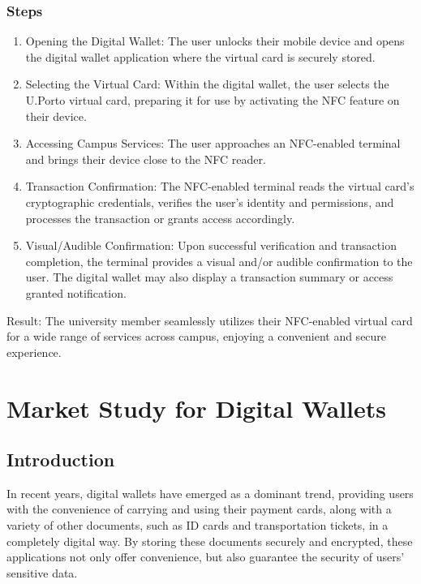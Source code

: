 \documentclass[10pt]{article}
\begin{document}
\subsubsection{Steps}
\begin{enumerate}
  \item Opening the Digital Wallet: The user unlocks their mobile device and opens the digital wallet application where the virtual card is securely stored.
  
  \item Selecting the Virtual Card: Within the digital wallet, the user selects the U.Porto virtual card, preparing it for use by activating the NFC feature on their device.
  
  \item Accessing Campus Services: The user approaches an NFC-enabled terminal and brings their device close to the NFC reader.
  
  \item Transaction Confirmation: The NFC-enabled terminal reads the virtual card's cryptographic credentials, verifies the user's identity and permissions, and processes the transaction or grants access accordingly.
  
  \item Visual/Audible Confirmation: Upon successful verification and transaction completion, the terminal provides a visual and/or audible confirmation to the user. The digital wallet may also display a transaction summary or access granted notification.
\end{enumerate}

Result: The university member seamlessly utilizes their NFC-enabled virtual card for a wide range of services across campus, enjoying a convenient and secure experience.

\section{Market Study for Digital Wallets}

\subsection{Introduction}

In recent years, digital wallets have emerged as a dominant trend, providing users with the convenience of carrying and using their payment cards, along with a variety of other documents, such as ID cards and transportation tickets, in a completely digital way. By storing these documents securely and encrypted, these applications not only offer convenience, but also guarantee the security of users' sensitive data.
\end{document}
